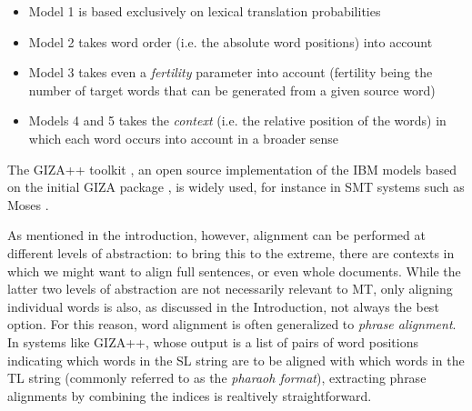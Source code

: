 \begin{itemize}
    \item Model 1 is based exclusively on lexical translation probabilities
    \item Model 2 takes word order (i.e. the absolute word positions) into account 
    \item Model 3 takes even a \textit{fertility} parameter into account (fertility being the number of target words that can be generated from a given source word)
    \item Models 4 and 5 takes the \textit{context} (i.e. the relative position of the words) in which each word occurs into account in a broader sense
\end{itemize}

The GIZA++ toolkit \cite{gizapp}, an open source implementation of the IBM models based on the initial GIZA package \cite{giza}, is widely used, for instance in SMT systems such as Moses \cite{moses}. \smallskip

As mentioned in the introduction, however, alignment can be performed at different levels of abstraction: to bring this to the extreme, there are contexts in which we might want to align full sentences, or even whole documents. While the latter two levels of abstraction are not necessarily relevant to MT, only aligning individual words is also, as discussed in the Introduction, not always the best option. For this reason, word alignment is often generalized to \textit{phrase alignment}. In systems like GIZA++, whose output is a list of pairs of word positions indicating which words in the SL string are to be aligned with which words in the TL string (commonly referred to as the \textit{pharaoh format}), extracting phrase alignments by combining the indices is realtively straightforward. \smallskip 

